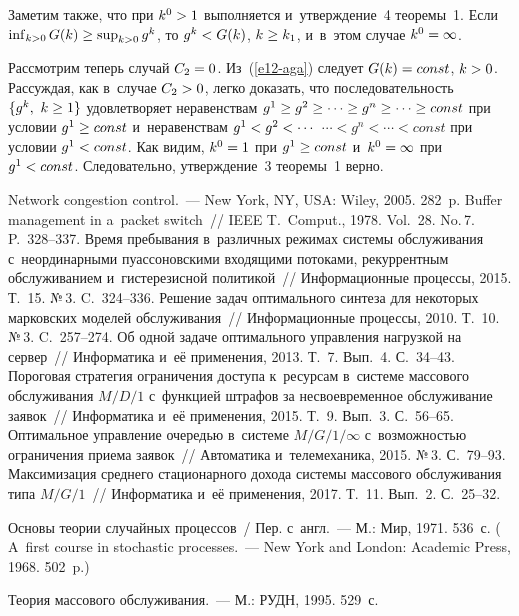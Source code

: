 \begin{multicols}{2}
{Заметим также, что при $k^0\hm>1$ выполняется и~утверждение~4 теоремы~1.  
Если $\mathop{\mathrm{inf}}\nolimits_{k>0} G(k)\hm\geq 
\mathop{\mathrm{sup}}\nolimits_{k>0} g^k$, 
то $g^k\hm< G(k)$, $k\hm\geq k_1$, и~в~этом случае 
$k^0\hm=\infty$. 
  
  Рассмотрим теперь случай $C_2\hm=0$. Из~(\ref{e12-aga}) следует 
$G(k)\hm=const$, $k\hm>0$. Рассуждая, как в~случае $C_2\hm>0$, легко 
доказать, что последовательность $\{g^k,\ k\hm\geq 1\}$ удовлетворяет 
неравенствам $g^1\hm\geq g^2\geq\cdots \geq g^n\geq \cdots\geq const$ при 
условии $g^1\hm\geq const$ и~неравенствам $g^1\hm< g^2<\cdots$\linebreak
$\cdots < g^n<\cdots < 
const$ при условии $g^1\hm< const$. Как видим, $k^0\hm=1$ при $g^1\hm\geq 
const$ и~$k^0\hm=\infty$ при $g^1\hm< const$. Следовательно, утверждение~3 
теоремы~1 верно.
}

  \vspace*{-8pt}
  
  
{\small\frenchspacing
 {%
 \begin{thebibliography}{99}
 Network congestion control.~--- New York, NY, USA: Wiley, 
2005. 282~p.
 Buffer management in a~packet switch~// IEEE T.~Comput., 1978. 
Vol.~28. No.\,7. P.~328--337.
  Время пребывания в~различных 
режимах системы обслуживания с~неординарными пуассоновскими 
входящими потоками, рекуррентным обслуживанием и~гистерезисной 
политикой~// Информационные процессы, 2015. Т.~15. №\,3. C.~324--336. 
 Решение задач оптимального синтеза для некоторых 
марковских моделей обслуживания~// Информационные процессы, 2010. 
Т.~10. №\,3. C.~257--274. 
 Об одной задаче оптимального управ\-ле\-ния нагрузкой 
на сервер~// Информатика и~её применения, 2013. Т.~7. Вып.~4. С.~34--43.
 Пороговая стратегия ограничения доступа к~ресурсам 
в~системе массового обслуживания $M/D/1$ с~функцией штрафов за несвоевременное обслуживание 
заявок~// Информатика и~её применения, 2015. Т.~9. Вып.~3. С.~56--65.
 Оптимальное управление очередью в~системе 
$M/G/1/\infty$ с~возможностью ограничения приема заявок~// Автоматика 
и~телемеханика, 2015. №\,3. С.~79--93. 
 Максимизация среднего стационарного дохода системы массового обслуживания 
типа $M/G/1$~// Информатика и~её применения, 2017. Т.~11. Вып.~2.  
С.~25--32.

  
 Основы теории случайных процессов~/ Пер. с~англ.~--- М.: 
Мир, 1971. 536~с. ( A~first course in stochastic processes.~---  
New York and London: Academic Press, 1968. 502~p.) 

 Теория массового обслуживания.~--- 
М.: РУДН, 1995. 529~с.

 \end{thebibliography}

 }
 }

\end{multicols}
